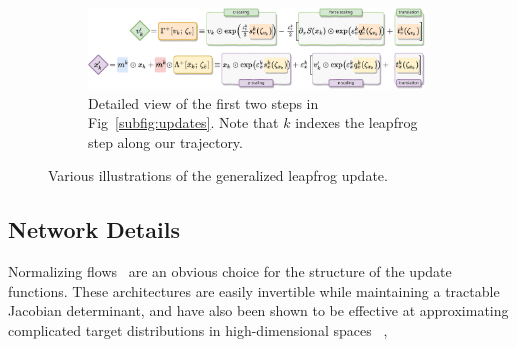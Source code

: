 \documentclass[a4paper,11pt]{article}
\begin{document}
\begin{figure}[htpb]
    \begin{subfigure}[t]{\textwidth}
        \includegraphics[width=0.98\textwidth]{assets/network_functions.pdf}
        \caption{\label{subfig:network_fns}Detailed view of the first two steps
        in Fig~\ref{subfig:updates}. Note that \(k\) indexes the leapfrog step
    along our trajectory.}
    \end{subfigure}
    \caption{\label{fig:networks}Various illustrations of the generalized
    leapfrog update.}
\end{figure}
%
%
\subsection{\label{subsec:networks}Network Details}
%
Normalizing flows~\cite{DinhSB16} are an obvious choice
for the structure of the update functions.
%
These architectures are easily invertible while maintaining a tractable
Jacobian determinant, and have also been shown to be effective at approximating
complicated target distributions in high-dimensional spaces ~\cite{%
    Foreman:2021ixr,%
    Kanwar:2020xzo,%
    DinhSB16,%
    Albergo:2021vyo,%
    Boyda:2020hsi,%
    wehenkelYouSayNormalizing2020a,%
    levyGeneralizingHamiltonianMonte2018b,%
    neklyudovOrbitalMCMC2020a,%
    neklyudovInvolutiveMcmcUnifying2020a%
},
\end{document}
